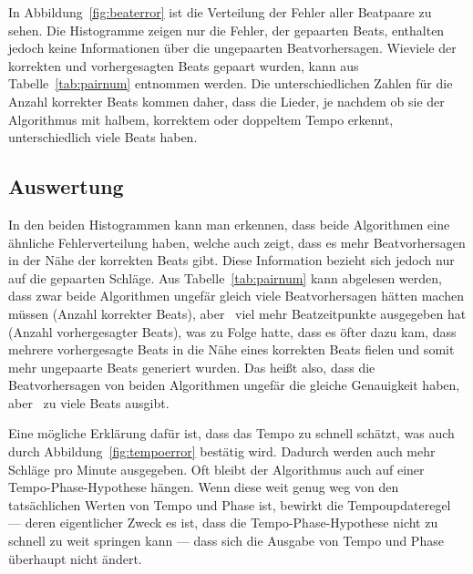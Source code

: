 {{		In Abbildung~\ref{fig:beaterror} ist die Verteilung der Fehler aller Beatpaare zu sehen.
		Die Histogramme zeigen nur die Fehler,
			der gepaarten Beats,
			enthalten jedoch keine Informationen über die ungepaarten Beatvorhersagen.
		Wieviele der korrekten und vorhergesagten Beats gepaart wurden,
			kann aus Tabelle~\ref{tab:pairnum} entnommen werden.
		Die unterschiedlichen Zahlen für die Anzahl korrekter Beats kommen daher,
			dass die Lieder,
			je nachdem ob sie der Algorithmus mit halbem, korrektem oder doppeltem Tempo erkennt,
			unterschiedlich viele Beats haben.
	}

	\subsection{Auswertung}
	{
		In den beiden Histogrammen kann man erkennen,
			dass beide Algorithmen eine ähnliche Fehlerverteilung haben,
			welche auch zeigt,
			dass es mehr Beatvorhersagen in der Nähe der korrekten Beats gibt.
		Diese Information bezieht sich jedoch nur auf die gepaarten Schläge.
		Aus Tabelle~\ref{tab:pairnum} kann abgelesen werden,
			dass zwar beide Algorithmen ungefär gleich viele Beatvorhersagen hätten machen müssen (Anzahl korrekter Beats),
			aber~\cite{2011_PlRoSt} viel mehr Beatzeitpunkte ausgegeben hat (Anzahl vorhergesagter Beats),
			was zu Folge hatte,
			dass es öfter dazu kam,
			dass mehrere vorhergesagte Beats in die Nähe eines korrekten Beats fielen
			und somit mehr ungepaarte Beats generiert wurden.
		Das hei{\ss}t also,
			dass die Beatvorhersagen von beiden Algorithmen ungefär die gleiche Genauigkeit haben,
			aber~\cite{2011_PlRoSt} zu viele Beats ausgibt.

		Eine mögliche Erklärung dafür ist,
			dass \cite{2011_PlRoSt} das Tempo zu schnell schätzt,
			was auch durch Abbildung~\ref{fig:tempoerror} bestätig wird.
		Dadurch werden auch mehr Schläge pro Minute ausgegeben.
		Oft bleibt der Algorithmus auch auf einer Tempo-Phase-Hypothese hängen.
		Wenn diese weit genug weg von den tatsächlichen Werten von Tempo und Phase ist,
			bewirkt die Tempoupdateregel ---
			deren eigentlicher Zweck es ist,
			dass die Tempo-Phase-Hypothese nicht zu schnell zu weit springen kann ---
			dass sich die Ausgabe von Tempo und Phase überhaupt nicht ändert.
	}
}

